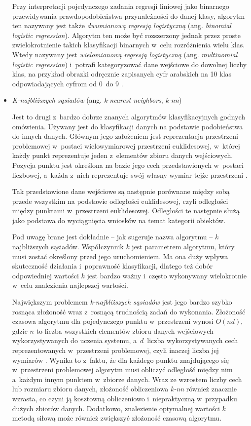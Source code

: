 \begin{itemize}
        Przy interpretacji pojedynczego zadania regresji liniowej jako binarnego przewidywania prawdopodobieństwa przynależności do danej klasy, algorytm ten nazywany jest także \emph{dwumianową regresją logistyczną} (ang. \emph{binomial logistic regression}).
        Algorytm ten może być rozszerzony jednak przez proste zwielokrotnienie takich klasyfikacji binarnych w~celu rozróżnienia wielu klas.
        Wtedy nazywany jest \emph{wielomianową regresją logistyczną} (ang. \emph{multinomial logistic regression}) i~potrafi kategoryzować dane wejściowe do dowolnej liczby klas, na przykład obrazki odręcznie zapisanych cyfr arabskich na 10 klas odpowiadających cyfrom od 0~do 9 \cite{palvanov2018comparisons}.

  \item \emph{K-najbliższych sąsiadów} (ang. \emph{k-nearest neighbors}, \emph{k-nn})

        Jest to drugi z~bardzo dobrze znanych algorytmów klasyfikacyjnych godnych omówienia.
        Używany jest do klasyfikacji danych na podstawie podobieństwa do innych danych.
        Głównym jego założeniem jest reprezentacja przestrzeni problemowej w~postaci wielowymiarowej przestrzeni euklidesowej, w~której każdy punkt reprezentuje jeden z~elementów zbioru danych wejściowych.
        Pozycja punktu jest określona na bazie jego cech przedstawionych w~postaci liczbowej, a~każda z~nich reprezentuje swój własny wymiar tejże przestrzeni \cite{kramer2013k}.

        Tak przedstawione dane wejściowe są następnie porównane między sobą przede wszystkim na podstawie odległości euklidesowej, czyli odległości między punktami w~przestrzeni euklidesowej.
        Odległości te następnie służą jako podstawa do wyciągnięcia wniosków na temat kategorii obiektów.

        Pod uwagę brane jest dokładnie -- jak sugeruje nazwa algorytmu -- $k$ najbliższych sąsiadów.
        Współczynnik $k$ jest parametrem algorytmu, który musi zostać określony przed jego uruchomieniem.
        Ma ona duży wpływa skuteczność działania i~poprawność klasyfikacji, dlatego też dobór odpowiedniej wartości $k$ jest bardzo ważny i~często wykonywany wielokrotnie w~celu znalezienia najlepszej wartości.

        Największym problemem \emph{k-najbliższych sąsiadów} jest jego bardzo szybko rosnąca złożoność wraz z~rosnącą trudnością zadań do wykonania.
        Złożoność czasowa algorytmu dla pojedynczego punktu w~przestrzeni wynosi $O(nd)$, gdzie $n$ to liczba wszystkich elementów zbioru danych wejściowych wykorzystywanych do uczenia systemu, a~$d$~liczba wykorzystywanych cech reprezentowanych w~przestrzeni problemowej, czyli inaczej liczba jej wymiarów \cite{laviale2023deep}.
        Wynika to z~faktu, że dla każdego punktu znajdującego się w~przestrzeni problemowej algorytm musi obliczyć odległość między nim a~każdym innym punktem w~zbiorze danych.
        Wraz ze wzrostem liczby cech lub rozmiaru zbioru danych, złożoność obliczeniowa \emph{k-nn} również znacznie wzrasta, co czyni ją kosztowną obliczeniowo i~niepraktyczną w~przypadku dużych zbiorów danych.
        Dodatkowo, znalezienie optymalnej wartości $k$ metodą siłową może również zwiększyć złożoność czasową algorytmu.


\end{itemize}
